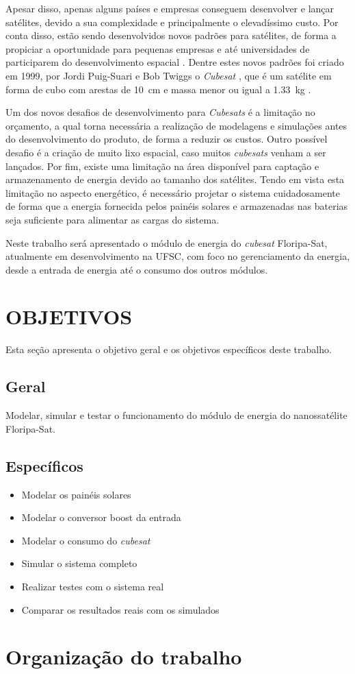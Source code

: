Apesar disso, apenas alguns países e empresas conseguem desenvolver e lançar satélites, devido a sua complexidade e principalmente o elevadíssimo custo. Por conta disso, estão sendo desenvolvidos novos padrões para satélites, de forma a propiciar a oportunidade para pequenas empresas e até universidades de participarem do desenvolvimento espacial \cite{Baker2008}. Dentre estes novos padrões foi criado em 1999, por Jordi Puig-Suari e Bob Twiggs o \textit{Cubesat} \cite{Messier2015}, que é um satélite em forma de cubo com arestas de \SI{10}{\centi\metre} e massa menor ou igual a \SI{1.33}{\kilo\gram} \cite{cubesatDesignSpecification2014}.

Um dos novos desafios de desenvolvimento para \textit{Cubesats} é a limitação no orçamento, a qual torna necessária a realização de modelagens e simulações antes do desenvolvimento do produto, de forma a reduzir os custos. Outro possível desafio é a criação de muito lixo espacial, caso muitos \textit{cubesats} venham a ser lançados. Por fim, existe uma limitação na área disponível para captação e armazenamento de energia devido ao tamanho dos satélites\cite{Kalman2011}. Tendo em vista esta limitação no aspecto energético, é necessário projetar o sistema cuidadosamente de forma que a energia fornecida pelos painéis solares e armazenadas nas baterias seja suficiente para alimentar as cargas do sistema.

Neste trabalho será apresentado o módulo de energia do \textit{cubesat} Floripa-Sat, atualmente em desenvolvimento na UFSC, com foco no gerenciamento da energia, desde a entrada de energia até o consumo dos outros módulos.

\section{OBJETIVOS}

Esta seção apresenta o objetivo geral e os objetivos específicos deste trabalho.

\subsection{Geral}

Modelar, simular e testar o funcionamento do módulo de energia do nanossatélite Floripa-Sat.

\subsection{Específicos}
\begin{itemize}
\item Modelar os painéis solares
\item Modelar o conversor boost da entrada
\item Modelar o consumo do \textit{cubesat}
\item Simular o sistema completo
\item Realizar testes com o sistema real
\item Comparar os resultados reais com os simulados
\end{itemize}

\section{Organização do trabalho}